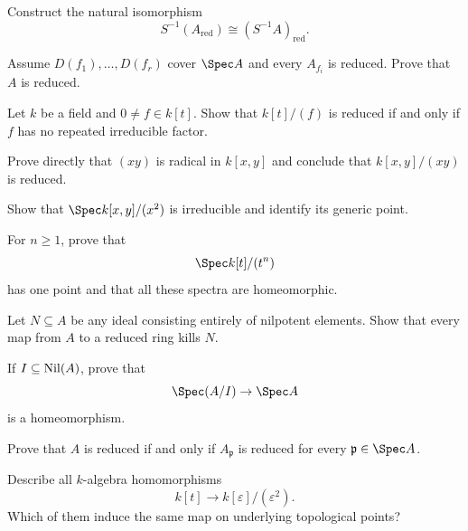 \begin{exercise}
Construct the natural isomorphism
\[
S^{-1}(A_{\mathrm{red}})\cong(S^{-1}A)_{\mathrm{red}}.
\]
\end{exercise}

\begin{exercise}
Assume $D(f_1),\dots,D(f_r)$ cover $\Spec A$ and every $A_{f_i}$ is reduced.  Prove that
$A$ is reduced.
\end{exercise}

\begin{exercise}
Let $k$ be a field and $0\ne f\in k[t]$.  Show that $k[t]/(f)$ is reduced if and only if
$f$ has no repeated irreducible factor.
\end{exercise}

\begin{exercise}
Prove directly that $(xy)$ is radical in $k[x,y]$ and conclude that
$k[x,y]/(xy)$ is reduced.
\end{exercise}

\begin{exercise}
Show that $\Spec k[x,y]/(x^2)$ is irreducible and identify its generic point.
\end{exercise}

\begin{exercise}
For $n\ge1$, prove that
\[
\Spec k[t]/(t^n)
\]
has one point and that all these spectra are homeomorphic.
\end{exercise}

\begin{exercise}
Let $N\subseteq A$ be any ideal consisting entirely of nilpotent elements.  Show that every
map from $A$ to a reduced ring kills $N$.
\end{exercise}

\begin{exercise}
If $I\subseteq\operatorname{Nil}(A)$, prove that
\[
\Spec(A/I)\to\Spec A
\]
is a homeomorphism.
\end{exercise}

\begin{exercise}
Prove that $A$ is reduced if and only if $A_{\mathfrak p}$ is reduced for every
$\mathfrak p\in\Spec A$.
\end{exercise}

\begin{exercise}
Describe all $k$-algebra homomorphisms
\[
k[t]\longrightarrow k[\varepsilon]/(\varepsilon^2).
\]
Which of them induce the same map on underlying topological points?
\end{exercise}
